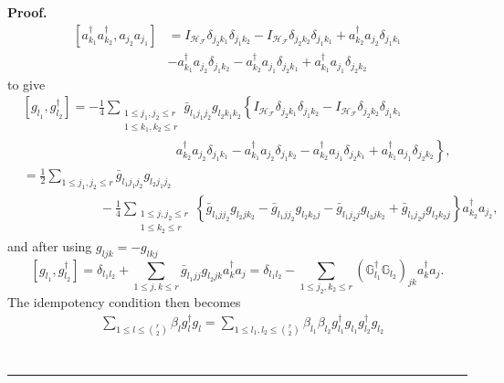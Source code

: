 \documentclass[aps,preprint]{revtex4}%
\newenvironment{proof}[1][Proof]{\noindent\textbf{#1.} }{\ \rule{0.5em}{0.5em}}
\begin{document}
\begin{proof}
\begin{align}
\left[  a_{k_{1}}^{\dagger}a_{k_{2}}^{\dagger},a_{j_{2}}a_{j_{1}}\right]   &
=I_{\mathcal{H}_{\mathcal{F}}}\delta_{j_{2}k_{1}}\delta_{j_{1}k_{2}%
}-I_{\mathcal{H}_{\mathcal{F}}}\delta_{j_{2}k_{2}}\delta_{j_{1}k_{1}}%
+a_{k_{2}}^{\dagger}a_{j_{2}}\delta_{j_{1}k_{1}}\nonumber\\
&  -a_{k_{1}}^{\dagger}a_{j_{2}}\delta_{j_{1}k_{2}}-a_{k_{2}}^{\dagger
}a_{j_{1}}\delta_{j_{2}k_{1}}+a_{k_{1}}^{\dagger}a_{j_{1}}\delta_{j_{2}k_{2}}%
\end{align}
to give
\begin{align}
&  \left[  g_{l_{1}},g_{l_{2}}^{\dagger}\right]  =-\frac{1}{4}\sum
_{\substack{1\leq j_{1},j_{2}\leq r\\1\leq k_{1},k_{2}\leq r}}\bar{g}%
_{l_{1}j_{1}j_{2}}g_{l_{2}k_{1}k_{2}}\left\{  I_{\mathcal{H}_{\mathcal{F}}%
}\delta_{j_{2}k_{1}}\delta_{j_{1}k_{2}}-I_{\mathcal{H}_{\mathcal{F}}}%
\delta_{j_{2}k_{2}}\delta_{j_{1}k_{1}}\right. \nonumber\\
&  \left.  \qquad\qquad\qquad\qquad\qquad\qquad\right.  \left.  a_{k_{2}%
}^{\dagger}a_{j_{2}}\delta_{j_{1}k_{1}}-a_{k_{1}}^{\dagger}a_{j_{2}}%
\delta_{j_{1}k_{2}}-a_{k_{2}}^{\dagger}a_{j_{1}}\delta_{j_{2}k_{1}}+a_{k_{1}%
}^{\dagger}a_{j_{1}}\delta_{j_{2}k_{2}}\right\}  ,\nonumber\\
&  =\frac{1}{2}\sum_{1\leq j_{1},j_{2}\leq r}\bar{g}_{l_{1}j_{1}j_{2}}%
g_{l_{2}j_{1}j_{2}}\nonumber\\
&  \qquad\qquad\qquad-\frac{1}{4}\sum_{\substack{1\leq j,j_{2}\leq r\\1\leq
k_{2}\leq r}}\left\{  \bar{g}_{l_{1}jj_{2}}g_{l_{2}jk_{2}}-\bar{g}%
_{l_{1}jj_{2}}g_{l_{2}k_{2}j}-\bar{g}_{l_{1}j_{2}j}g_{l_{2}jk_{2}}+\bar
{g}_{l_{1}j_{2}j}g_{l_{2}k_{2}j}\right\}  a_{k_{2}}^{\dagger}a_{j_{2}},
\end{align}
and after using $g_{ljk}=-g_{lkj}$
\begin{equation}
\left[  g_{l_{1}},g_{l_{2}}^{\dagger}\right]  =\delta_{l_{1}l_{2}}+\sum_{1\leq
j,k\leq r}\bar{g}_{l_{1}jj}g_{l_{2}jk}a_{k}^{\dagger}a_{j}=\delta_{l_{1}l_{2}%
}-\sum_{1\leq j_{2},k_{2}\leq r}\left(  \mathbb{G}_{l_{1}}^{\dagger}%
\mathbb{G}_{l_{2}}\right)  _{jk}a_{k}^{\dagger}a_{j}.
\end{equation}
The idempotency condition then becomes%
\begin{align}
&  \sum_{1\leq l\leq\binom{r}{2}}\beta_{l}g_{l}^{\dagger}g_{l}=\sum_{1\leq
l_{1},l_{2}\leq\binom{r}{2}}\beta_{l_{1}}\beta_{l_{2}}g_{l_{1}}^{\dagger
}g_{l_{1}}g_{l_{2}}^{\dagger}g_{l_{2}}\nonumber\\

\end{align}
\end{proof}
\end{document}
